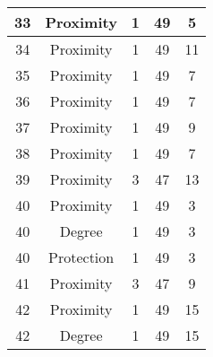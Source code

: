 \documentclass[results.tex]{subfiles}
\begin{document}
\begin{center}
\begin{tabular}{| c || c | c | c | c |}
            \hline
            33                      & Proximity                    & 1                      & 49                      & 5                    \\
            \hline
            34                      & Proximity                    & 1                      & 49                      & 11                   \\
            \hline
            35                      & Proximity                    & 1                      & 49                      & 7                    \\
            \hline
            36                      & Proximity                    & 1                      & 49                      & 7                    \\
            \hline
            37                      & Proximity                    & 1                      & 49                      & 9                    \\
            \hline
            38                      & Proximity                    & 1                      & 49                      & 7                    \\
            \hline
            39                      & Proximity                    & 3                      & 47                      & 13                   \\
            \hline
            40                      & Proximity                    & 1                      & 49                      & 3                    \\
            \hline
            40                      & Degree                       & 1                      & 49                      & 3                    \\
            \hline
            40                      & Protection                   & 1                      & 49                      & 3                    \\
            \hline
            41                      & Proximity                    & 3                      & 47                      & 9                    \\
            \hline
            42                      & Proximity                    & 1                      & 49                      & 15                   \\
            \hline
            42                      & Degree                       & 1                      & 49                      & 15                   \\

\end{tabular}
\end{center}
\end{document}
